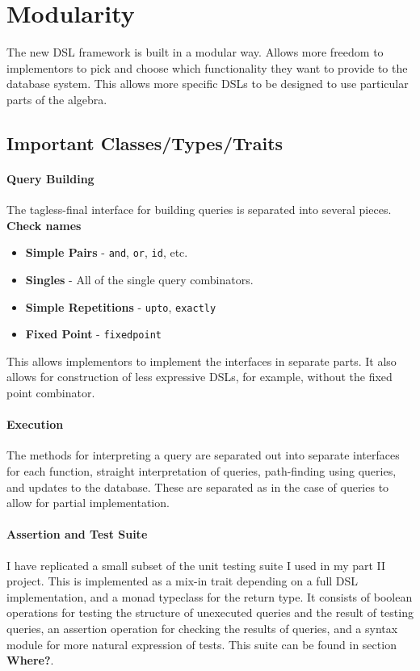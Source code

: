 \documentclass{report}
\newcommand \2[0]{\textbf{2}}
\newcommand \3[0]{\textbf{3}}
\newcommand{\todo}[1]{\textbf{#1}}
\begin{document}
\section{Modularity}
The new DSL framework is built in a modular way. 
Allows more freedom to implementors to pick and choose which functionality they want to provide to the database system. This allows more specific DSLs to be designed to use particular parts of the algebra.
\subsection{Important Classes/Types/Traits}
\paragraph{Query Building}
The tagless-final interface for building queries is separated into several pieces.
\todo{Check names}
\begin{itemize}
    \item \textbf{Simple Pairs} - \texttt{and}, \texttt{or}, \texttt{id}, etc.
    \item \textbf{Singles} - All of the single query combinators.
    \item \textbf{Simple Repetitions} - \texttt{upto}, \texttt{exactly}
    \item \textbf{Fixed Point} - \texttt{fixedpoint}
\end{itemize}

This allows implementors to implement the interfaces in separate parts. It also allows for construction of less expressive DSLs, for example, without the fixed point combinator.

\paragraph{Execution}
The methods for interpreting a query are separated out into separate interfaces for each function, straight interpretation of queries, path-finding using queries, and updates to the database. These are separated as in the case of queries to allow for partial implementation.

\paragraph{Assertion and Test Suite}
I have replicated a small subset of the unit testing suite I used in my part II project. This is implemented as a mix-in trait depending on a full DSL implementation, and a monad typeclass for the return type. It consists of boolean operations for testing the structure of unexecuted queries and the result of testing queries, an assertion operation for checking the results of queries, and a syntax module for more natural expression of tests. This suite can be found in section \todo{Where?}.
\end{document}
